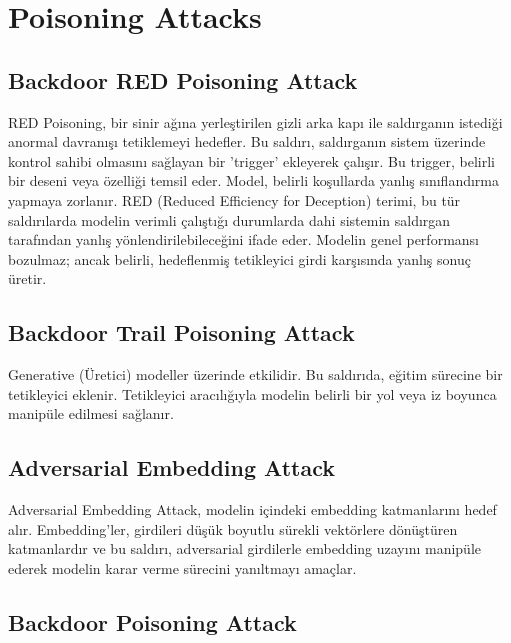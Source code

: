 \section{Poisoning Attacks}

\subsection{Backdoor RED Poisoning Attack}

RED Poisoning, bir sinir ağına yerleştirilen gizli arka kapı ile saldırganın istediği anormal davranışı tetiklemeyi hedefler. Bu saldırı, saldırganın sistem üzerinde kontrol sahibi olmasını sağlayan bir 'trigger' ekleyerek çalışır. Bu trigger, belirli bir deseni veya özelliği temsil eder. Model, belirli koşullarda yanlış sınıflandırma yapmaya zorlanır. RED (Reduced Efficiency for Deception) terimi, bu tür saldırılarda modelin verimli çalıştığı durumlarda dahi sistemin saldırgan tarafından yanlış yönlendirilebileceğini ifade eder. Modelin genel performansı bozulmaz; ancak belirli, hedeflenmiş tetikleyici girdi karşısında yanlış sonuç üretir.

\newpage

\subsection{Backdoor Trail Poisoning Attack}

Generative (Üretici) modeller üzerinde etkilidir. Bu saldırıda, eğitim sürecine bir tetikleyici eklenir. Tetikleyici aracılığıyla modelin belirli bir yol veya iz boyunca manipüle edilmesi sağlanır. 

\newpage

\subsection{Adversarial Embedding Attack}

Adversarial Embedding Attack, modelin içindeki embedding katmanlarını hedef alır. Embedding'ler, girdileri düşük boyutlu sürekli vektörlere dönüştüren katmanlardır ve bu saldırı, adversarial girdilerle embedding uzayını manipüle ederek modelin karar verme sürecini yanıltmayı amaçlar.

\newpage

\subsection{Backdoor Poisoning Attack}

